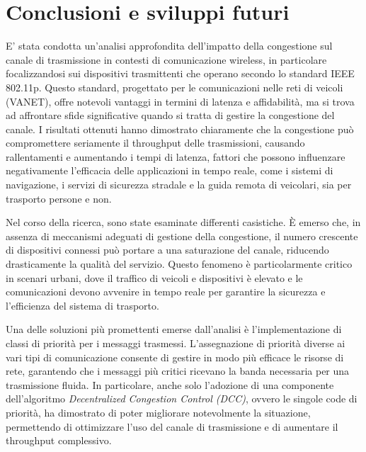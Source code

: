 \chapter{Conclusioni e sviluppi futuri}

E' stata condotta un'analisi approfondita dell'impatto della congestione sul canale di trasmissione in contesti di comunicazione wireless, in particolare focalizzandosi sui dispositivi trasmittenti che operano secondo lo standard IEEE 802.11p. Questo standard, progettato per le comunicazioni nelle reti di veicoli (VANET), offre notevoli vantaggi in termini di latenza e affidabilità, ma si trova ad affrontare sfide significative quando si tratta di gestire la congestione del canale. I risultati ottenuti hanno dimostrato chiaramente che la congestione può compromettere seriamente il throughput delle trasmissioni, causando rallentamenti e aumentando i tempi di latenza, fattori che possono influenzare negativamente l'efficacia delle applicazioni in tempo reale, come i sistemi di navigazione, i servizi di sicurezza stradale e la guida remota di veicolari, sia per trasporto persone e non.

Nel corso della ricerca, sono state esaminate differenti casistiche. È emerso che, in assenza di meccanismi adeguati di gestione della congestione, il numero crescente di dispositivi connessi può portare a una saturazione del canale, riducendo drasticamente la qualità del servizio. Questo fenomeno è particolarmente critico in scenari urbani, dove il traffico di veicoli e dispositivi è elevato e le comunicazioni devono avvenire in tempo reale per garantire la sicurezza e l'efficienza del sistema di trasporto.

Una delle soluzioni più promettenti emerse dall'analisi è l'implementazione di classi di priorità per i messaggi trasmessi. L'assegnazione di priorità diverse ai vari tipi di comunicazione consente di gestire in modo più efficace le risorse di rete, garantendo che i messaggi più critici ricevano la banda necessaria per una trasmissione fluida. In particolare, anche solo l’adozione di una componente dell’algoritmo \textit{Decentralized Congestion Control (DCC)}, ovvero le singole code di priorità, ha dimostrato di poter migliorare notevolmente la situazione, permettendo di ottimizzare l'uso del canale di trasmissione e di aumentare il throughput complessivo.

